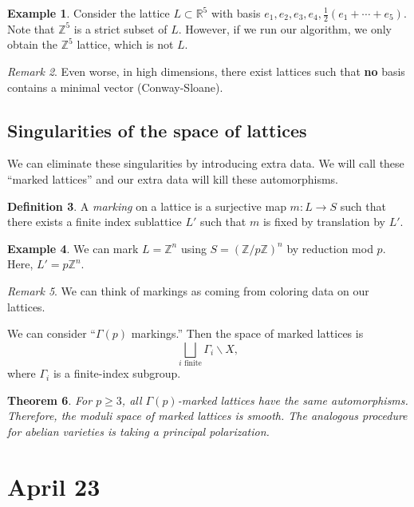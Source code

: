 \documentclass[leqno, openany]{memoir}
\newtheorem{thm}{Theorem}[chapter]
\theoremstyle{definition}
\newtheorem{defn}[thm]{Definition}
\newtheorem{exm}[thm]{Example}
\theoremstyle{remark}
\newtheorem{rmk}[thm]{Remark}
\theoremstyle{plain}
\theoremstyle{definition}
\theoremstyle{remark}
\newcommand{\R}{\mathbb{R}}
\newcommand{\Z}{\mathbb{Z}}
\begin{document}
\begin{exm}
    Consider the lattice $L \subset \R^5$ with basis $e_1, e_2, e_3, e_4, \frac{1}{2} (e_1 + \cdots + e_5)$. Note that $\Z^5$ is a strict subset of $L$. However, if we run our algorithm, we only obtain the $\Z^5$ lattice, which is not $L$.
\end{exm}

\begin{rmk}
    Even worse, in high dimensions, there exist lattices such that \textbf{no} basis contains a minimal vector (Conway-Sloane).
\end{rmk}

\section{Singularities of the space of lattices}%
\label{sec:singularities_in_gamma_backslash_x_}

We can eliminate these singularities by introducing extra data. We will call these ``marked lattices'' and our extra data will kill these automorphisms.

\begin{defn}
    A \textit{marking} on a lattice is a surjective map $m:L \to S$ such that there exists a finite index sublattice $L'$ such that $m$ is fixed by translation by $L'$.
\end{defn}

\begin{exm}
    We can mark $L = \Z^n$ using $S = (\Z/p\Z)^n$ by reduction mod $p$. Here, $L' = p\Z^n$.
\end{exm}

\begin{rmk}
    We can think of markings as coming from coloring data on our lattices.
\end{rmk}

We can consider ``$\Gamma(p)$ markings.'' Then the space of marked lattices is
\[ \bigsqcup_{i \text{ finite}} \Gamma_i \backslash X, \]
where $\Gamma_i$ is a finite-index subgroup.

\begin{thm}
    For $p \geq 3$, all $\Gamma(p)$-marked lattices have the same automorphisms. Therefore, the moduli space of marked lattices is smooth. The analogous procedure for abelian varieties is taking a principal polarization.
\end{thm}

\chapter{April 23}%
\label{cha:april_23}
\end{document}
